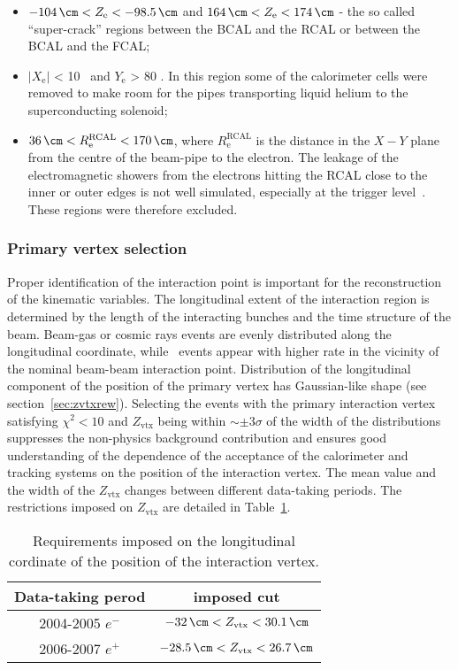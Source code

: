 \begin{itemize}
	\begin{itemize}
		\item $ -104\, \cm < Z_\text{e} < -98.5\, \cm	$ and $ 164\, \cm < Z_\text{e} < 174\, \cm $ - the so called ``super-crack'' regions between the BCAL and the RCAL or between the BCAL and the FCAL;
		\item $\left| X_\text{e} \right|$ < 10 \cm\, and $Y_\text{e}$ > 80 \cm. In this region some of the calorimeter cells were removed to make room for the  pipes transporting  liquid helium to the superconducting solenoid;
		\item $ 36\, \cm < R^\text{RCAL}_\text{e} < 170\, \cm $, where $R^\text{RCAL}_\text{e}$ is the distance in the $X-Y$ plane from the centre of the beam-pipe to the electron. The leakage of the electromagnetic showers from the electrons hitting the RCAL close to the inner or outer edges is not well simulated, especially at the trigger level~\cite{januschek-p96}. These regions were therefore excluded. 
	\end{itemize}
\end{itemize}

\subsubsection{Primary vertex selection}
\label{subsubsec:vtxselect}
Proper identification of the interaction point is important for the reconstruction of the kinematic variables. The longitudinal extent of the interaction region is determined by the length of the interacting bunches and the time structure of the beam. Beam-gas or cosmic rays events are evenly distributed along the longitudinal coordinate, while \ep\, events appear with higher rate in the vicinity of the nominal beam-beam interaction point. Distribution of the longitudinal component of the position of the primary vertex has Gaussian-like shape (see section~\ref{sec:zvtxrew}). Selecting the events with the primary interaction vertex satisfying $\chi^2 < 10$ and $Z_\text{vtx}$ being within $\sim \pm 3\sigma$ of the width of the distributions suppresses the non-physics background contribution and ensures good understanding of the dependence of the acceptance of the calorimeter and tracking systems on the position of the interaction vertex. The mean value and the width of the $Z_\text{vtx}$ changes between different data-taking periods. The restrictions imposed on $Z_\text{vtx}$ are detailed in Table~\ref{tab:zvxcut}.
\begin{table}[htbp]
	\centering
		\begin{tabular}{|c|c|}
			\hline
			Data-taking perod & imposed cut \\
			\hline
			\hline
			2004-2005 $e^{-}$ & $-32\,\cm<Z_\text{vtx}<30.1\,\cm$ \\
			2006-2007 $e^{+}$ & $-28.5\,\cm<Z_\text{vtx}<26.7\,\cm$ \\
			\hline
		\end{tabular}
	\caption{Requirements imposed on the longitudinal cordinate of the position of the interaction vertex.}
	\label{tab:zvxcut}
\end{table}

